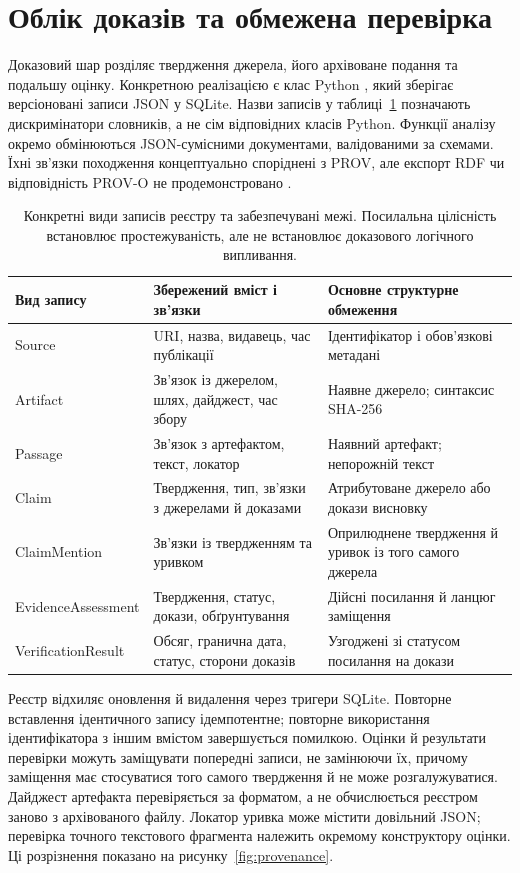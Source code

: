 \section{Облік доказів та обмежена перевірка}
\label{sec:evidence}

Доказовий шар розділяє твердження джерела, його архівоване подання та подальшу оцінку. Конкретною реалізацією є клас Python , який зберігає версіоновані записи JSON у SQLite. Назви записів у таблиці~\ref{tab:evidence} позначають дискримінатори словників, а не сім відповідних класів Python. Функції аналізу окремо обмінюються JSON-сумісними документами, валідованими за схемами. Їхні зв'язки походження концептуально споріднені з PROV, але експорт RDF чи відповідність PROV-O не продемонстровано \citep{moreau2013provdm,lebo2013provo}.

\begin{table}[!htbp]
\centering
\small
\caption{Конкретні види записів реєстру та забезпечувані межі. Посилальна цілісність встановлює простежуваність, але не встановлює доказового логічного випливання.}
\label{tab:evidence}
\begin{tabularx}{\linewidth}{@{}lXX@{}}
\toprule
Вид запису & Збережений вміст і зв'язки & Основне структурне обмеження \\
\midrule
Source & URI, назва, видавець, час публікації & Ідентифікатор і обов'язкові метадані \\
Artifact & Зв'язок із джерелом, шлях, дайджест, час збору & Наявне джерело; синтаксис SHA-256 \\
Passage & Зв'язок з артефактом, текст, локатор & Наявний артефакт; непорожній текст \\
Claim & Твердження, тип, зв'язки з джерелами й доказами & Атрибутоване джерело або докази висновку \\
ClaimMention & Зв'язки із твердженням та уривком & Оприлюднене твердження й уривок із того самого джерела \\
EvidenceAssessment & Твердження, статус, докази, обґрунтування & Дійсні посилання й ланцюг заміщення \\
VerificationResult & Обсяг, гранична дата, статус, сторони доказів & Узгоджені зі статусом посилання на докази \\
\bottomrule
\end{tabularx}
\end{table}

Реєстр відхиляє оновлення й видалення через тригери SQLite. Повторне вставлення ідентичного запису ідемпотентне; повторне використання ідентифікатора з іншим вмістом завершується помилкою. Оцінки й результати перевірки можуть заміщувати попередні записи, не замінюючи їх, причому заміщення має стосуватися того самого твердження й не може розгалужуватися. Дайджест артефакта перевіряється за форматом, а не обчислюється реєстром заново з архівованого файлу. Локатор уривка може містити довільний JSON; перевірка точного текстового фрагмента належить окремому конструктору оцінки. Ці розрізнення показано на рисунку~\ref{fig:provenance}.

